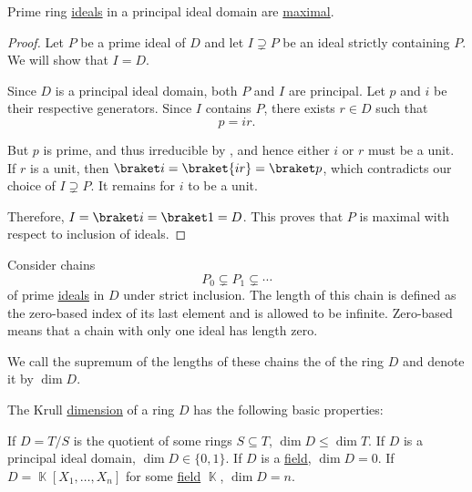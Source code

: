 \begin{proposition}\label{thm:prime_ideals_are_maximal_in_pid}
  Prime ring \hyperref[def:prime_ring_ideal]{ideals} in a principal ideal domain are \hyperref[def:maximal_ring_ideal]{maximal}.
\end{proposition}
\begin{proof}
  Let \( P \) be a prime ideal of \( D \) and let \( I \supsetneq P \) be an ideal strictly containing \( P \). We will show that \( I = D \).

  Since \( D \) is a principal ideal domain, both \( P \) and \( I \) are principal. Let \( p \) and \( i \) be their respective generators. Since \( I \) contains \( P \), there exists \( r \in D \) such that
  \begin{equation*}
    p = ir.
  \end{equation*}

  But \( p \) is prime, and thus irreducible by , and hence either \( i \) or \( r \) must be a unit. If \( r \) is a unit, then \( \braket i = \braket {ir} = \braket p \), which contradicts our choice of \( I \supsetneq P \). It remains for \( i \) to be a unit.

  Therefore, \( I = \braket i = \braket 1 = D \). This proves that \( P \) is maximal with respect to inclusion of ideals.
\end{proof}

\begin{definition}\label{def:krull_dimension}
  Consider chains
  \begin{equation*}
    P_0 \subsetneq P_1 \subsetneq \cdots
  \end{equation*}
  of prime \hyperref[def:prime_ring_ideal]{ideals} in \( D \) under strict inclusion. The length of this chain is defined as the zero-based index of its last element and is allowed to be infinite. Zero-based means that a chain with only one ideal has length zero.

  We call the supremum of the lengths of these chains the  of the ring \( D \) and denote it by \( \dim D \).
\end{definition}

\begin{proposition}\label{thm:def:krull_dimension/properties}
  The Krull \hyperref[def:krull_dimension]{dimension} of a ring \( D \) has the following basic properties:
  \begin{thmenum}
     If \( D = T / S \) is the quotient of some rings \( S \subseteq T \), \( \dim D \leq \dim T \).
     If \( D \) is a principal ideal domain, \( \dim D \in \{ 0, 1 \} \).
     If \( D \) is a \hyperref[def:field]{field}, \( \dim D = 0 \).
    \cite[exercise 8.19]{КоцевСидеров2016} If \( D = \BbbK[X_1, \ldots, X_n] \) for some \hyperref[def:field]{field} \( \BbbK \), \( \dim D = n \).
  \end{thmenum}
\end{proposition}

